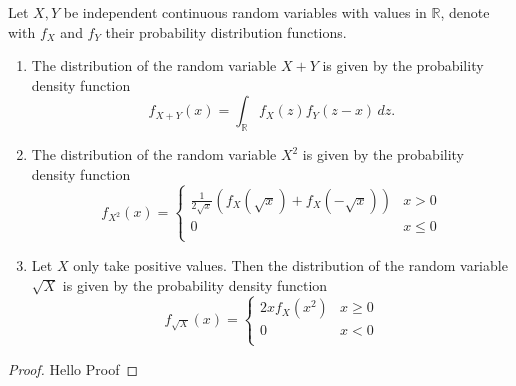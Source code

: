 \begin{lemma} \label{lemma:transform_random_variable} 
  Let $X,Y$ be independent continuous random variables with values in
  $\mathbb{R}$, denote with $f_X$ and $f_Y$ their probability
  distribution functions.%
  \begin{enumerate}[label=(\arabic*),ref=(\arabic*), itemsep=-0.6cm]
    \item The distribution of the random variable $X+Y$ is given by
      the probability density function%
      \[%
        f_{X+Y}(x) = \int_{\mathbb{R}} f_X(z) f_Y(z-x)\, dz.  
      \]%
    \item The distribution of the random variable $X^2$ is given by
      the probability density function
      \[
        f_{X^2}(x) = %
        \begin{cases} 
          \frac{1}{2\sqrt{x}}\left(f_X(\sqrt{x})+f_X(-\sqrt{x})\right)
           & x > 0 \\           0     & x \leq 0 \\
        \end{cases}
      \]
    \item Let $X$ only take positive values. Then the distribution of
      the random variable $\sqrt{X}$ is given by the probability
      density function
      \[
        f_{\sqrt{X}}(x) = %
        \begin{cases}
          2x f_X(x^2) & x \geq 0 \\0   & x < 0 \\
        \end{cases}
      \]
  \end{enumerate}
\end{lemma}
%
\begin{proof}
Hello Proof
\end{proof}

